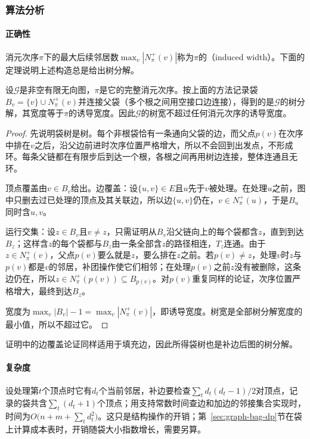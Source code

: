 \subsubsection{算法分析}

\paragraph{正确性}
消元次序$\pi$下的最大后续邻居数$\max_v|N^+_\pi(v)|$称为$\pi$的（induced width）。下面的定理说明上述构造总是给出树分解。

\begin{theorem}[消元次序产生树分解]
\label{thm:graph-dp-elimination-decomposition}
设$\mathcal G$是非空有限无向图，$\pi$是它的完整消元次序。按上面的方法记录袋$B_v=\{v\}\cup N^+_\pi(v)$并连接父袋（多个根之间用空接口边连接），得到的是$\mathcal G$的树分解，其宽度等于$\pi$的诱导宽度。因此$\mathcal G$的树宽不超过任何消元次序的诱导宽度。
\end{theorem}

\begin{proof}
先说明袋树是树。每个非根袋恰有一条通向父袋的边，而父点$p(v)$在次序中排在$v$之后，沿父边前进时次序位置严格增大，所以不会回到出发点，不形成环。每条父链都在有限步后到达一个根，各根之间再用树边连接，整体连通且无环。

顶点覆盖由$v\in B_v$给出。边覆盖：设$\{u,v\}\in E$且$u$先于$v$被处理。在处理$u$之前，图中只删去过已处理的顶点及其关联边，所以边$\{u,v\}$仍在，$v\in N^+_\pi(u)$，于是$B_u$同时含$u,v$。

运行交集：设$z\in B_v$且$v\neq z$，只需证明从$B_v$沿父链向上的每个袋都含$z$，直到到达$B_z$；这样含$z$的每个袋都与$B_z$由一条全部含$z$的路径相连，$T_z$连通。由于$z\in N^+_\pi(v)$，父点$p(v)$要么就是$z$，要么排在$z$之前。若$p(v)\neq z$，处理$v$时$z$与$p(v)$都是$v$的邻居，补团操作使它们相邻；在处理$p(v)$之前$z$没有被删除，这条边仍在，所以$z\in N^+_\pi(p(v))\subseteq B_{p(v)}$。对$p(v)$重复同样的论证，次序位置严格增大，最终到达$B_z$。

宽度为$\max_v|B_v|-1=\max_v|N^+_\pi(v)|$，即诱导宽度。树宽是全部树分解宽度的最小值，所以不超过它。
\end{proof}

证明中的边覆盖论证同样适用于填充边，因此所得袋树也是补边后图的树分解。

\paragraph{复杂度}
设处理第$t$个顶点时它有$d_t$个当前邻居，补边要检查$\sum_t d_t(d_t-1)/2$对顶点，记录的袋共含$\sum_t(d_t+1)$个顶点；用支持常数时间查边和加边的邻接集合实现时，时间为$O\bigl(n+m+\sum_t d_t^2\bigr)$。这只是结构操作的开销；第~\ref{sec:graph-bag-dp}节在袋上计算成本表时，开销随袋大小指数增长，需要另算。

